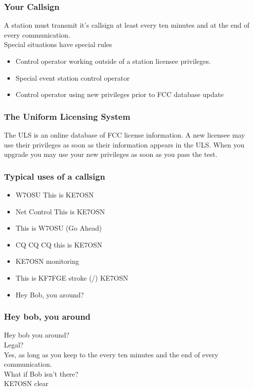 \documentclass[12pt]{beamer}
\begin{document}
\begin{frame}
\frametitle{Your Callsign}
A station must transmit it's callsign at least every ten minutes and at the end of every communication.\\
Special situations have special rules\\
\begin{itemize}
\item Control operator working outside of a station licensee privileges.
\item Special event station control operator
\item Control operator using new privileges prior to FCC database update
\end{itemize}
\end{frame}

\begin{frame}
\frametitle{The Uniform Licensing System}
The ULS is an online database of FCC license information. A new licensee may use their privileges as soon as their information appears in the ULS. When you upgrade you may use your new privileges as soon as you pass the test.
\end{frame}

\begin{frame}
\frametitle{Typical uses of a callsign}
\begin{itemize}
\item W7OSU This is KE7OSN \pause
\item Net Control This is KE7OSN \pause
\item This is W7OSU (Go Ahead) \pause
\item CQ CQ CQ this is KE7OSN \pause
\item KE7OSN monitoring \pause
\item This is KF7FGE stroke (/) KE7OSN \pause
\item Hey Bob, you around?
\end{itemize}
\end{frame}

\begin{frame}
\frametitle{Hey bob, you around}
Hey bob you around?\\
Legal? \\ \pause
Yes, as long as you keep to the every ten minutes and the end of every communication. \\ \pause
What if Bob isn't there? \\ \pause
KE7OSN clear
\end{frame}
\end{document}

